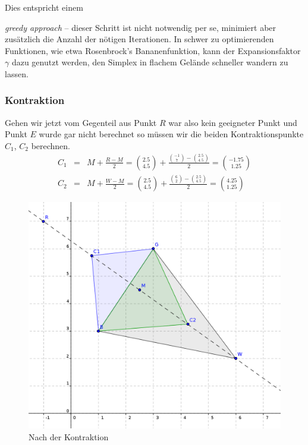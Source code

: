 \documentclass[naustrian]{article}
\begin{document}
Dies entspricht einem {\emph{greedy approach} -- dieser
Schritt ist nicht notwendig per se, minimiert aber zusätzlich die Anzahl
der nötigen Iterationen. In schwer zu optimierenden Funktionen, wie etwa
Rosenbrock's Bananenfunktion, kann der Expansionsfaktor $\gamma$ dazu genutzt werden,
den Simplex in flachem Gelände schneller wandern zu lassen.

\subsubsection{Kontraktion}

Gehen wir jetzt vom Gegenteil aus \textendash{} Punkt $R$ war also
kein geeigneter Punkt und Punkt $E$ wurde gar nicht berechnet \textendash{}
so müssen wir die beiden Kontraktionspunkte $C_{1}$, $C_{2}$ berechnen.
\begin{eqnarray*}
    C_{1} & = & M+\frac{R-M}{2}=\binom{2.5}{4.5}+\frac{\binom{-1}{7}-\binom{2.5}{4.5}}{2}=\binom{-1.75}{1.25}\\
    C_{2} & = & M+\frac{W-M}{2}=\binom{2.5}{4.5}+\frac{\binom{6}{2}-\binom{2.5}{4.5}}{2}=\binom{4.25}{1.25}
\end{eqnarray*}

\begin{figure}[H]
    \centering
    \includegraphics{nelder_mead/triangle_contract}
    \caption{Nach der Kontraktion}
\end{figure}

}
\end{document}
